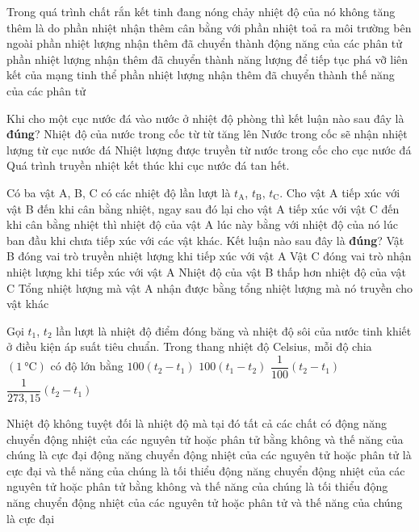 \begin{ex}
Trong quá trình chất rắn kết tinh đang nóng chảy nhiệt độ của nó không tăng thêm là do
	\choice
	{phần nhiệt nhận thêm cân bằng với phần nhiệt toả ra môi trường bên ngoài}
	{phần nhiệt lượng nhận thêm đã chuyển thành động năng của các phân tử}
	{\True phần nhiệt lượng nhận thêm đã chuyển thành năng lượng để tiếp tục phá vỡ liên kết của mạng tinh thể}
	{phần nhiệt lượng nhận thêm đã chuyển thành thế năng của các phân tử}
	\loigiai{}
\end{ex}
\begin{ex}
	Khi cho một cục nước đá vào nước ở nhiệt độ phòng thì kết luận nào sau đây là \textbf{đúng}?
	\choice
	{Nhiệt độ của nước trong cốc từ từ tăng lên}
	{Nước trong cốc sẽ nhận nhiệt lượng từ cục nước đá}
	{\True Nhiệt lượng được truyền từ nước trong cốc cho cục nước đá}
	{Quá trình truyền nhiệt kết thúc khi cục nước đá tan hết.}
	\loigiai{}
\end{ex}
\begin{ex}
	Có ba vật A, B, C có các nhiệt độ lần lượt là $t_\text{A}$, $t_\text{B}$, $t_\text{C}$. Cho vật A tiếp xúc với vật B đến khi cân bằng nhiệt, ngay sau đó lại cho vật A tiếp xúc với vật C đến khi cân bằng nhiệt thì nhiệt độ của vật A lúc này bằng với nhiệt độ của nó lúc ban đầu khi chưa tiếp xúc với các vật khác. Kết luận nào sau đây là \textbf{đúng}?
	\choice
	{Vật B đóng vai trò truyền nhiệt lượng khi tiếp xúc với vật A}
	{Vật C đóng vai trò nhận nhiệt lượng khi tiếp xúc với vật A}
	{Nhiệt độ của vật B thấp hơn nhiệt độ của vật C}
	{\True Tổng nhiệt lượng mà vật A nhận được bằng tổng nhiệt lượng mà nó truyền cho vật khác}
	\loigiai{}
\end{ex}
\begin{ex}
	Gọi $t_1$, $t_2$ lần lượt là nhiệt độ điểm đóng băng và nhiệt độ sôi của nước tinh khiết ở điều kiện áp suất tiêu chuẩn. Trong thang nhiệt độ Celsius, mỗi độ chia $\left(\SI{1}{\celsius}\right)$ có độ lớn bằng
	\choice
	{$100\left(t_2-t_1\right)$}
	{$100\left(t_1-t_2\right)$}
	{\True $\dfrac{1}{100}\left(t_2-t_1\right)$}
	{$\dfrac{1}{273,15}\left(t_2-t_1\right)$}
	\loigiai{}
\end{ex}
\begin{ex}
Nhiệt độ không tuyệt đối là nhiệt độ mà tại đó tất cả các chất có	
	\choice
	{động năng chuyển động nhiệt của các nguyên tử hoặc phân tử bằng không và thế năng của chúng là cực đại}
	{động năng chuyển động nhiệt của các nguyên tử hoặc phân tử là cực đại và thế năng của chúng là tối thiểu}
	{\True động năng chuyển động nhiệt của các nguyên tử hoặc phân tử bằng không và thế năng của chúng là tối thiểu}
	{động năng chuyển động nhiệt của các nguyên tử hoặc phân tử và thế năng của chúng là cực đại}
	\loigiai{}
\end{ex}
